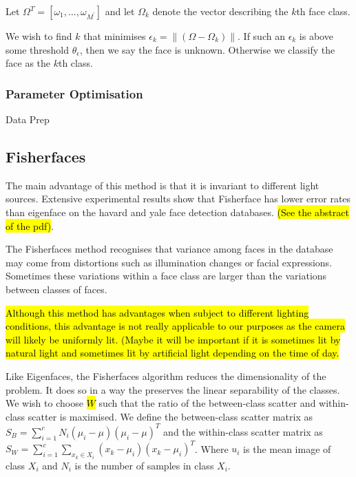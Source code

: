 \documentclass{article}
\begin{document}
Let $\Omega^T = [\omega_1, \ldots, \omega_{M^\prime}]$ and let $\Omega_k$ denote the vector describing the $k$th face class.

We wish to find $k$ that minimises $\epsilon_k = \|(\Omega - \Omega_k)\|$. If such an $\epsilon_k$ is above some threshold $\theta_\epsilon$, then we say the face is unknown. Otherwise we classify the face as the $k$th class.

\subsubsection{Parameter Optimisation}
Data Prep

\subsection{Fisherfaces}
The main advantage of this method is that it is invariant to different light sources. Extensive experimental results show that Fisherface has lower error rates than eigenface on the havard and yale face detection databases. \hl{(See the abstract of the pdf)}.

The Fisherfaces method recognises that variance among faces in the database may come from distortions such as illumination changes or facial expressions. Sometimes these variations within a face class are larger than the variations between classes of faces.

\hl{Although this method has advantages when subject to different lighting conditions, this advantage is not really applicable to our purposes as the camera will likely be uniformly lit. (Maybe it will be important if it is sometimes lit by natural light and sometimes lit by artificial light depending on the time of day.}

Like Eigenfaces, the Fisherfaces algorithm reduces the dimensionality of the problem. It does so in a way the preserves the linear separability of the classes. We wish to choose \hl{$W$} such that the ratio of the between-class scatter and within-class scatter is maximised. We define the between-class scatter matrix as $S_B = \sum_{i=1}^{c}N_i(\mu_i - \mu)(\mu_i - \mu)^T$ and the within-class scatter matrix as  $S_W = \sum_{i=1}^{c}\sum_{x_k\in X_i}(x_k - \mu_i)(x_k - \mu_i)^T$. Where $u_i$ is the mean image of class $X_i$ and $N_i$ is the number of samples in class $X_i$.
\end{document}
